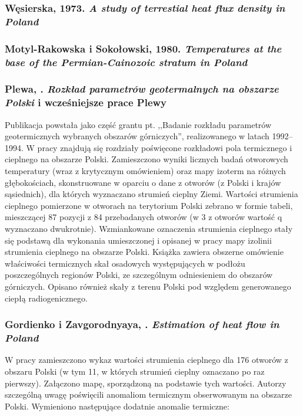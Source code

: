 \documentclass[11.5pt,twoside]{report}
\begin{document}
\subsubsection{Węsierska, 1973. \textit{A study of terrestial heat flux density in Poland}} 

\subsubsection{Motyl-Rakowska i Sokołowski, 1980. \textit{Temperatures at the base of the Permian-Cainozoic stratum in Poland}}

\subsubsection{Plewa, \citeyear{Plewa.1994}. \textit{Rozkład parametrów geotermalnych na obszarze Polski} i wcześniejsze prace Plewy}

Publikacja powstała jako część grantu pt. ,,Badanie rozkładu parametrów geotermicznych wybranych obszarów górniczych'', realizowanego w latach 1992--1994. W pracy znajdują się rozdziały poświęcone rozkładowi pola termicznego i cieplnego na obszarze Polski. Zamieszczono wyniki licznych badań otworowych temperatury (wraz z krytycznym omówieniem) oraz mapy izoterm na różnych głębokościach, skonstruowane w oparciu o dane z otworów (z Polski i krajów sąsiednich), dla których wyznaczano strumień cieplny Ziemi. Wartości strumienia cieplnego pomierzone w otworach na terytorium Polski zebrano w formie tabeli, mieszczącej 87 pozycji z 84 przebadanych otworów (w 3 z otworów wartość q wyznaczano dwukrotnie). Wzmiankowane oznaczenia strumienia cieplnego stały się podstawą dla wykonania umieszczonej i opisanej w pracy mapy izolinii strumienia cieplnego na obszarze Polski. Książka zawiera obszerne omówienie właściwości termicznych skał osadowych występujących w podłożu poszczególnych regionów Polski, ze szczególnym odniesieniem do obszarów górniczych. Opisano również skały z terenu Polski pod względem generowanego ciepłą radiogenicznego.

\subsubsection{Gordienko i Zavgorodnyaya, \citeyear{Gordienko.1996}. \textit{Estimation of heat flow in Poland}}

W pracy zamieszczono wykaz wartości strumienia cieplnego dla 176 otworów z obszaru Polski (w tym 11, w których strumień cieplny oznaczano po raz pierwszy). Załączono mapę, sporządzoną na podstawie tych wartości. Autorzy szczególną uwagę poświęcili anomaliom termicznym obserwowanym na obszarze Polski. Wymieniono następujące dodatnie anomalie termiczne:
\end{document}
